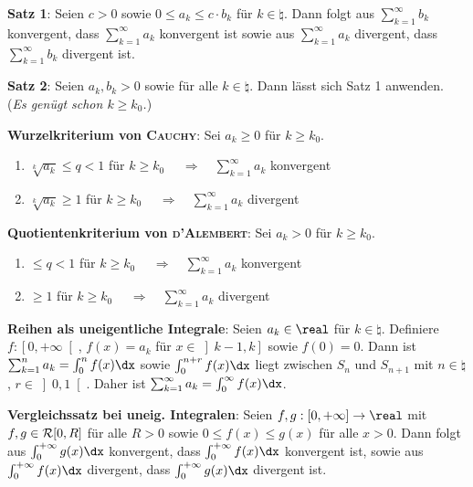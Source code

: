 \textbf{Satz 1}:
Seien $c > 0$ sowie $0 \le a_k \le c \cdot b_k$ für $k \in \natural$.
Dann folgt aus $\sum_{k=1}^\infty b_k$ konvergent, dass
$\sum_{k=1}^\infty a_k$ konvergent ist sowie aus
$\sum_{k=1}^\infty a_k$ divergent, dass
$\sum_{k=1}^\infty b_k$ divergent ist.

\textbf{Satz 2}:
Seien $a_k, b_k > 0$ sowie
 für alle
$k \in \natural$. \quad
Dann lässt sich Satz 1 anwenden. \\
(\emph{Es genügt schon $k \ge k_0$.})

\linie

\textbf{Wurzelkriterium von \textsc{Cauchy}}:
Sei $a_k \ge 0$ für $k \ge k_0$.
\begin{enumerate}
    \item $\sqrt[k]{a_k} \le q < 1$ für $k \ge k_0$
    $\quad\Rightarrow\quad \sum_{k=1}^\infty a_k$ konvergent

    \item $\sqrt[k]{a_k} \ge 1$ für $k \ge k_0$
    $\quad\Rightarrow\quad \sum_{k=1}^\infty a_k$ divergent
\end{enumerate}

\textbf{Quotientenkriterium von \textsc{d'Alembert}}:
Sei $a_k > 0$ für $k \ge k_0$.
\begin{enumerate}
    \item {} $\le q < 1$ für $k \ge k_0$
    $\quad\Rightarrow\quad \sum_{k=1}^\infty a_k$ konvergent

    \item {} $\ge 1$ für $k \ge k_0$
    $\quad\Rightarrow\quad \sum_{k=1}^\infty a_k$ divergent
\end{enumerate}

\linie

\textbf{Reihen als uneigentliche Integrale}:
Seien $a_k \in \real$ für $k \in \natural$.
Definiere $f: \left[0,+\infty\right[$, $f(x) = a_k$ für
$x \in \left]k-1,k\right]$ sowie $f(0) = 0$.
Dann ist $\sum_{k=1}^n a_k = \int_0^n f(x)\dx$ sowie
$\int_0^{n+r} f(x)\dx$ liegt zwischen $S_n$ und $S_{n+1}$ mit
$n \in \natural$, $r \in \left]0,1\right[$.
Daher ist $\sum_{k=1}^\infty a_k = \int_0^\infty f(x)\dx$.

\textbf{Vergleichssatz bei uneig. Integralen}:
Seien $f, g: [0,+\infty] \rightarrow \real$ mit $f, g \in \mathcal{R}[0, R]$ für
alle $R > 0$ sowie $0 \le f(x) \le g(x)$ für alle $x > 0$.
Dann folgt aus $\int_0^{+\infty} g(x)\dx$ konvergent, dass
$\int_0^{+\infty} f(x)\dx$ konvergent ist, sowie aus
$\int_0^{+\infty} f(x)\dx$ divergent, dass
$\int_0^{+\infty} g(x)\dx$ divergent ist.

